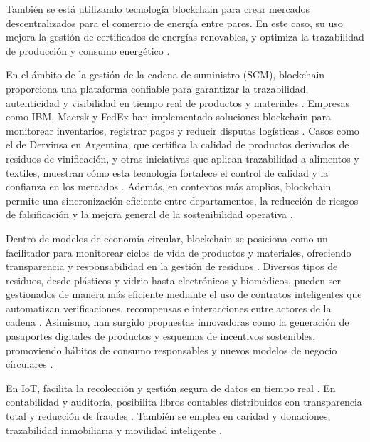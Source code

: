 También se está utilizando tecnología blockchain para crear mercados descentralizados para el comercio de energía entre pares. En este caso, su uso mejora la gestión de certificados de energías renovables, y optimiza la trazabilidad de producción y consumo energético \cite{sunny2022systematic, vaigandla2023review}.

En el ámbito de la gestión de la cadena de suministro (SCM), blockchain proporciona una plataforma confiable para garantizar la trazabilidad, autenticidad y visibilidad en tiempo real de productos y materiales \cite{torres2022tendencias, sharabati2024blockchain}. Empresas como IBM, Maersk y FedEx han implementado soluciones blockchain para monitorear inventarios, registrar pagos y reducir disputas logísticas \cite{tripathi2023comprehensive}. Casos como el de Dervinsa en Argentina, que certifica la calidad de productos derivados de residuos de vinificación, y otras iniciativas que aplican trazabilidad a alimentos y textiles, muestran cómo esta tecnología fortalece el control de calidad y la confianza en los mercados \cite{bartolomeo2020introduccion}. Además, en contextos más amplios, blockchain permite una sincronización eficiente entre departamentos, la reducción de riesgos de falsificación y la mejora general de la sostenibilidad operativa \cite{sunny2022systematic}.

Dentro de modelos de economía circular, blockchain se posiciona como un facilitador para monitorear ciclos de vida de productos y materiales, ofreciendo transparencia y responsabilidad en la gestión de residuos \cite{bulkowska2023implementation, baralla2023waste}. Diversos tipos de residuos, desde plásticos y vidrio hasta electrónicos y biomédicos, pueden ser gestionados de manera más eficiente mediante el uso de contratos inteligentes que automatizan verificaciones, recompensas e interacciones entre actores de la cadena \cite{baralla2023waste}. Asimismo, han surgido propuestas innovadoras como la generación de pasaportes digitales de productos y esquemas de incentivos sostenibles, promoviendo hábitos de consumo responsables y nuevos modelos de negocio circulares \cite{baralla2023waste}.

En IoT, facilita la recolección y gestión segura de datos en tiempo real \cite{sunny2022systematic}. En contabilidad y auditoría, posibilita libros contables distribuidos con transparencia total y reducción de fraudes \cite{bartolomeo2020introduccion}. También se emplea en caridad y donaciones, trazabilidad inmobiliaria y movilidad inteligente \cite{bartolomeo2020introduccion}. 

